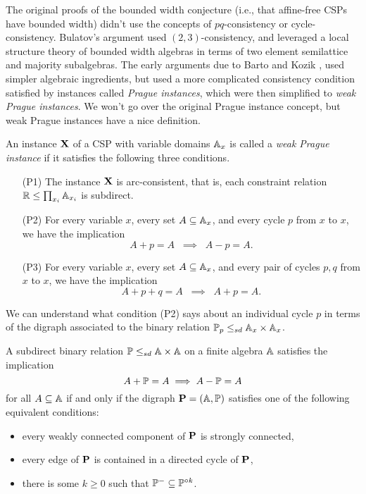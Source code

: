 \documentclass[letterpaper,11pt]{article}
\begin{document}
The original proofs of the bounded width conjecture (i.e., that affine-free CSPs have bounded width) didn't use the concepts of $pq$-consistency or cycle-consistency. Bulatov's argument \cite{bulatov-bounded} used $(2,3)$-consistency, and leveraged a local structure theory of bounded width algebras in terms of two element semilattice and majority subalgebras. The early arguments due to Barto and Kozik \cite{barto}, \cite{local-consistency} used simpler algebraic ingredients, but used a more complicated consistency condition satisfied by instances called \emph{Prague instances}, which were then simplified to \emph{weak Prague instances}. We won't go over the original Prague instance concept, but weak Prague instances have a nice definition.

\begin{defn}\label{defn-weak-prague} An instance $\mathbf{X}$ of a CSP with variable domains $\mathbb{A}_x$ is called a \emph{weak Prague instance} if it satisfies the following three conditions.
\begin{itemize}
\item[(P1)] The instance $\mathbf{X}$ is arc-consistent, that is, each constraint relation $\mathbb{R} \le \prod_{x_i} \mathbb{A}_{x_i}$ is subdirect.
\item[(P2)] For every variable $x$, every set $A \subseteq \mathbb{A}_x$, and every cycle $p$ from $x$ to $x$, we have the implication
\[
A + p = A \;\; \implies \;\; A - p = A.
\]
\item[(P3)] For every variable $x$, every set $A \subseteq \mathbb{A}_x$, and every pair of cycles $p,q$ from $x$ to $x$, we have the implication
\[
A + p + q = A \;\; \implies \;\; A + p = A.
\]
\end{itemize}
\end{defn}

We can understand what condition (P2) says about an individual cycle $p$ in terms of the digraph associated to the binary relation $\mathbb{P}_p \le_{sd} \mathbb{A}_x \times \mathbb{A}_x$.

\begin{prop}\label{prop-p2} A subdirect binary relation $\mathbb{P} \le_{sd} \mathbb{A} \times \mathbb{A}$ on a finite algebra $\mathbb{A}$ satisfies the implication
\[
A + \mathbb{P} = A \implies A - \mathbb{P} = A
\]
for all $A \subseteq \mathbb{A}$ if and only if the digraph $\mathbf{P} = (\mathbb{A},\mathbb{P})$ satisfies one of the following equivalent conditions:
\begin{itemize}
\item every weakly connected component of $\mathbf{P}$ is strongly connected,
\item every edge of $\mathbf{P}$ is contained in a directed cycle of $\mathbf{P}$,
\item there is some $k \ge 0$ such that $\mathbb{P}^- \subseteq \mathbb{P}^{\circ k}$.
\end{itemize}
\end{prop}
\end{document}
